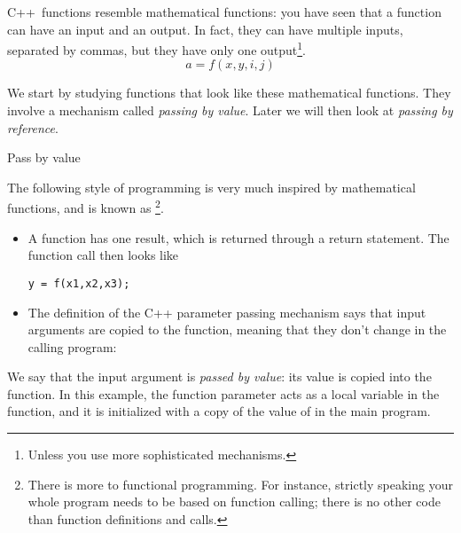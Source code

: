 
C++~functions resemble mathematical functions: you have seen that a
function can have an input and an output. In fact, they can have
multiple inputs, separated by commas, but they have only one
output\footnote{Unless you use more sophisticated mechanisms.}.
\[ a = f(x,y,i,j) \]

We start by studying functions that look like these mathematical
functions. They involve a  mechanism
called
\emph{passing by value}.
%
Later we will then look at
\emph{passing by reference}.

 {Pass by value}

The following style of programming is very much inspired by
mathematical functions, and is known as \footnote {There is more to functional programming. For
  instance, strictly speaking your whole program needs to be based on
  function calling; there is no other code than function definitions
  and calls.}.
\begin{itemize}
\item A function has one result, which is returned through a return
  statement. The function call then looks like
\begin{lstlisting}
y = f(x1,x2,x3);
\end{lstlisting}
\item The definition of the C++ parameter passing mechanism says that
  input arguments are copied to the function, meaning that they don't
  change in the calling program:

\end{itemize}

We say that the input argument is \emph{passed by
  value}: its value is copied into the
function.  In this example, the function parameter  acts as a
local variable in the function, and it is initialized with a copy of
the value of  in the main program.


